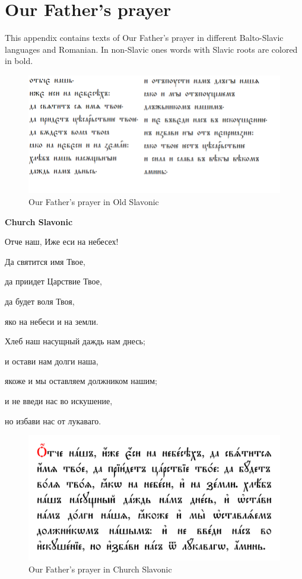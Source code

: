\section{Our Father's prayer}

This appendix contains texts of Our Father's prayer in different Balto-Slavic languages and Romanian. In non-Slavic ones words with Slavic roots are colored in bold.

\begin{figure}
	\includegraphics[width=\linewidth]{./sources/of-old-slav.png}
	\caption{Our Father's prayer in Old Slavonic}
	\label{fig:of-old-slav}
\end{figure}

\textbf{Church Slavonic}

Отче наш, Иже еси на небесех!

Да святится имя Твое,

да приидет Царствие Твое,

да будет воля Твоя,

яко на небеси и на земли.

Хлеб наш насущный даждь нам днесь;

и остави нам долги наша,

якоже и мы оставляем должником нашим;

и не введи нас во искушение,

но избави нас от лукаваго.

\begin{figure}
	\includegraphics[width=\linewidth]{./sources/of-church-slav.png}
	\caption{Our Father's prayer in Church Slavonic}
	\label{fig:of-church-slav}
\end{figure}

